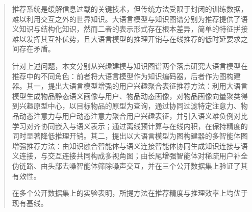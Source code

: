 

\begin{abstract}
  推荐系统是缓解信息过载的关键技术，但传统方法受限于封闭的训练数据，难以利用交互之外的世界知识。大语言模型与知识图谱分别为推荐提供了语义知识与结构化知识，然而二者的表示形式存在根本差异，简单的特征拼接难以发挥其互补优势，且大语言模型的推理开销与在线推荐的低时延要求之间存在矛盾。

  针对上述问题，本文分别从兴趣建模与知识图谱两个落点研究大语言模型在推荐中的不同角色：前者将大语言模型作为知识编码器，后者作为图构建器。其一，提出大语言模型增强的用户兴趣聚合表征推荐方法：利用大语言模型生成物品静态语义画像与用户、物品动态画像，对物品画像向量聚类得到兴趣原型中心，以目标物品的原型为查询，通过协同过滤特定注意力、物品动态注意力与用户动态注意力聚合用户兴趣表征，并引入语义难负例对比学习对齐协同嵌入与语义表示；通过离线预计算与在线内积，在保持精度的同时显著降低推理开销。其二，提出以大语言模型为图构建器的多智能体图增强推荐方法：由知识融合智能体与语义连接智能体协同生成知识连接与语义连接，与交互连接共同构成多视角图；由长尾增强智能体对稀疏用户补全伪链路、由头部去噪智能体筛除噪声交互，并在三个公开数据集上验证了其有效性。

  在多个公开数据集上的实验表明，所提方法在推荐精度与推理效率上均优于现有基线。

\end{abstract}

